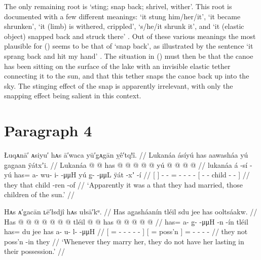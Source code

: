 The only remaining root is  ‘sting; snap back; shrivel, wither’.
This root is documented with a few different meanings:  ‘it stung him/her/it’,  ‘it became shrunken’,  ‘it (limb) is withered, crippled’,  ‘s/he/it shrunk it’, and  ‘it (elastic object) snapped back and struck there’ \parencite[791]{leer:1976}.
Out of these various meanings the most plausible for (\lastx) seems to be that of ‘snap back’, as illustrated by the sentence  ‘it sprang back and hit my hand’ \parencite[190.2631]{story-naish:1973}.
The situation in (\lastx) must then be that the canoe has been sitting on the surface of the lake with an invisible elastic tether connecting it to the sun, and that this tether snaps the canoe back up into the sky.
The stinging effect of the snap is apparently irrelevant, with only the snapping effect being salient in this context.

\section{Paragraph 4}\label{sec:89-para-4}

\ex\label{ex:89-52-married-lukanaa}%
%
\begingl
	\glpreamble	Łuqᴀnā′ ᴀsiyu′ hᴀs ā′waca yū′g̣ᴀgān ỵê′tq!î. //
	\glpreamble	Lukanáa ásíyú has aawasháa yú g̱agaan ÿátxʼi. //
	\gla	{} Lukanáa {}
		 @ {} @ {}
		has @  @ {} @ {} @ {} @ {}
		{} yú  @ {} @ {}  @ {} @ {} {} //
	\glb	{} lukanáa {}
		á -sí -yú
		has= a- wu- i-  -μμH
		{} yú g̱-  -μμL ÿát -xʼ -í {} //
	\glc	{}[  {}]
		 - -
		= - - -  -
		{}[  -  - child - - {}] //
	\gld	{}  {}
		 {} {}
		they  {} {} {} {}
		{} that  {} {} child -ren -of {} //
	\glft	‘Apparently it was a  that they had married, those children of the sun.’
		//
\endgl
\xe

\ex\label{ex:89-53-marry-not-last-long}%
%
\begingl
	\glpreamble	Hᴀs ᴀ′g̣acān ʟē′łsdjî hᴀs ułsā′kᵘ. //
	\glpreamble	Has ag̱asháanín tléil sdu jee has ooltsáakw. //
	\gla	{} Has @  @ {} @ {} @ {} @ {} @ {} @ {} {}
		tléil {}  @ {}  @ {} {}
		has @  @ {} @ {} @ {} @ {} //
	\glb	{} has= a- {} g̱-  -μμH -n -ín {}
		tléil {} has= du jee {} {}
		has a- u- l-  -μμH //
	\glc	{}[ = - \· -  - - - {}]
		 {}[ =  poss’n \· {}]
		= - - -  - //
	\gld	{} they  {} {} {} {} {} {} {}
		not {}  {} poss’n -in {}
		they  {} {} {} {}  //
	\glft	‘Whenever they marry her, they do not have her lasting in their possession.’
		//
\endgl
\xe


